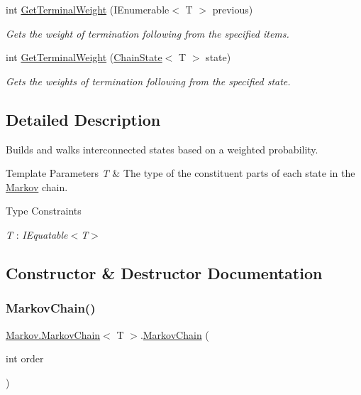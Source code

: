 \begin{DoxyCompactItemize}
int \mbox{\hyperlink{class_markov_1_1_markov_chain_a893aace9c71c5837682db3827a5a2426}{Get\+Terminal\+Weight}} (I\+Enumerable$<$ T $>$ previous)
\begin{DoxyCompactList}\small\item\em Gets the weight of termination following from the specified items. \end{DoxyCompactList}\item 
int \mbox{\hyperlink{class_markov_1_1_markov_chain_a51cbf6330b16387447e761749161b768}{Get\+Terminal\+Weight}} (\mbox{\hyperlink{class_markov_1_1_chain_state}{Chain\+State}}$<$ T $>$ state)
\begin{DoxyCompactList}\small\item\em Gets the weights of termination following from the specified state. \end{DoxyCompactList}\end{DoxyCompactItemize}


\subsection{Detailed Description}
Builds and walks interconnected states based on a weighted probability. 


\begin{DoxyTemplParams}{Template Parameters}
{\em T} & The type of the constituent parts of each state in the \mbox{\hyperlink{namespace_markov}{Markov}} chain.\\
\hline
\end{DoxyTemplParams}
\begin{Desc}
\item[Type Constraints]\begin{description}
\item[{\em T} : {\em I\+Equatable$<$T$>$}]\end{description}
\end{Desc}


\subsection{Constructor \& Destructor Documentation}
\mbox{\label{class_markov_1_1_markov_chain_a9cb6d5ce158a936323be57ae55622086}} 
\subsubsection{\texorpdfstring{Markov\+Chain()}{MarkovChain()}}
{\footnotesize\ttfamily \mbox{\hyperlink{class_markov_1_1_markov_chain}{Markov.\+Markov\+Chain}}$<$ T $>$.\mbox{\hyperlink{class_markov_1_1_markov_chain}{Markov\+Chain}} (\begin{DoxyParamCaption}\item[{int}]{order }\end{DoxyParamCaption})}



